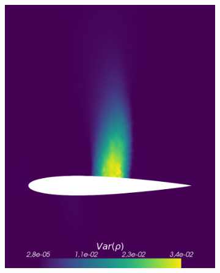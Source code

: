 \begin{figure}[h!]
\begin{subfigure}{0.329\linewidth}
		\includegraphics[width=\linewidth]{figs/Euler2D/sc50UncertainMaSigma0-025PSigma1000-0Dim2_VarRho.png}
		\caption{}
		\label{fig:referenceSolutionsub2DVar}
	\end{subfigure}
	\hfill
	\begin{subfigure}{0.329\linewidth}
		\centering

\end{subfigure}
\end{figure}
